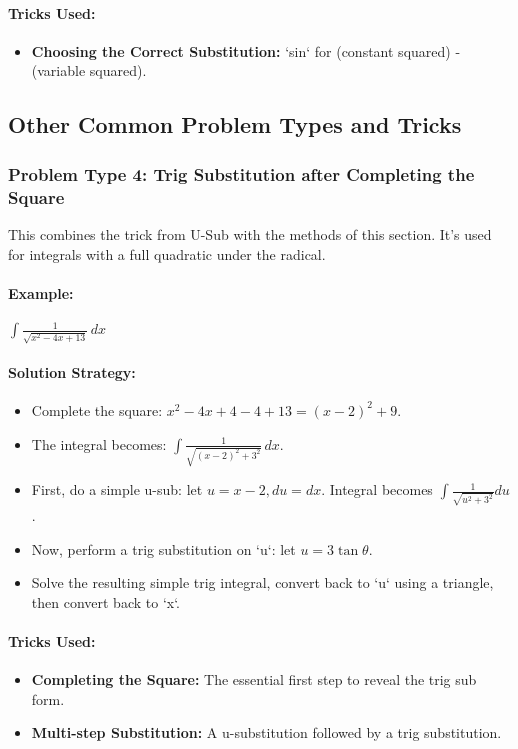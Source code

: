 \documentclass{article}
\begin{document}
\paragraph{Tricks Used:}
\begin{itemize}
    \item \textbf{Choosing the Correct Substitution:} `sin` for (constant squared) - (variable squared).
\end{itemize}

\subsection{Other Common Problem Types and Tricks}
\subsubsection{Problem Type 4: Trig Substitution after Completing the Square}
This combines the trick from U-Sub with the methods of this section. It's used for integrals with a full quadratic under the radical.
\paragraph{Example:} $ \int \frac{1}{\sqrt{x^2-4x+13}} \,dx $
\paragraph{Solution Strategy:}
\begin{itemize}
    \item Complete the square: $x^2-4x+4-4+13 = (x-2)^2 + 9$.
    \item The integral becomes: $\int \frac{1}{\sqrt{(x-2)^2 + 3^2}} \,dx$.
    \item First, do a simple u-sub: let $u=x-2, du=dx$. Integral becomes $\int \frac{1}{\sqrt{u^2+3^2}}du$.
    \item Now, perform a trig substitution on `u`: let $u = 3\tan\theta$.
    \item Solve the resulting simple trig integral, convert back to `u` using a triangle, then convert back to `x`.
\end{itemize}
\paragraph{Tricks Used:}
\begin{itemize}
    \item \textbf{Completing the Square:} The essential first step to reveal the trig sub form.
    \item \textbf{Multi-step Substitution:} A u-substitution followed by a trig substitution.
\end{itemize}
\end{document}
